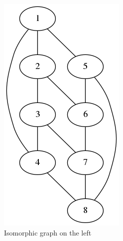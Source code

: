 \begin{figure}[H]
  \begin{subfigure}[b]{0.2\textwidth}
    \includegraphics[width=\textwidth]{isomorphismleft}
    \caption{Isomorphic graph on the left}
    \label{fig:isomorphism}
  \end{subfigure}
  \hfill
  \begin{subfigure}[b]{0.4\textwidth}

\end{subfigure}
\end{figure}
